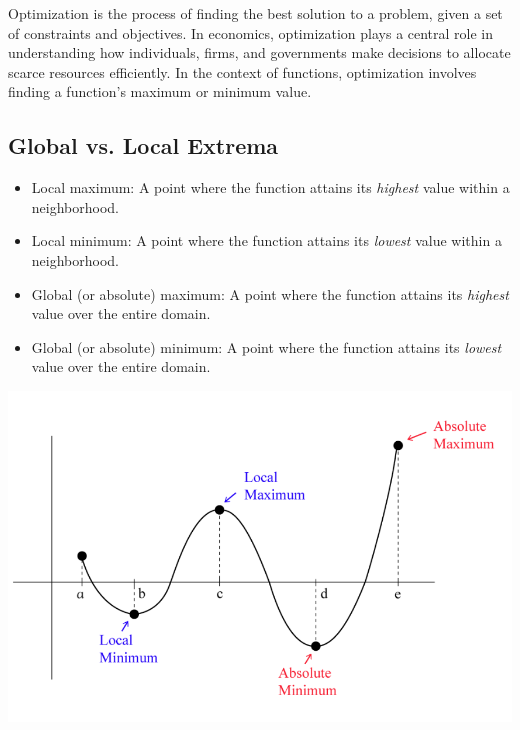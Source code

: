 \documentclass{./../Latex/handout}
\begin{document}
\thispagestyle{plain}
\newcommand{\mytitle}{Optimization}
\myheader{\mytitle}

Optimization is the process of finding the best solution to a problem, given a set of constraints and objectives. In economics, optimization plays a central role in understanding how individuals, firms, and governments make decisions to allocate scarce resources efficiently. In the context of functions, optimization involves finding a function's maximum or minimum value. 

\vspace{-1em}
\subsection*{Global vs. Local Extrema}
\begin{itemize}
  \item Local maximum: A point where the function attains its \textit{highest} value within a neighborhood. 
 \item Local minimum: A point where the function attains its \textit{lowest} value within a neighborhood.
 \item Global (or absolute) maximum: A point where the function attains its \textit{highest} value over the entire domain.
 \item Global (or absolute) minimum: A point where the function attains its \textit{lowest} value over the entire domain.
 \end{itemize}
 
\begin{center}
\includegraphics[scale=0.4]{./Input/global_vs_local.png}	\\
\end{center} 
\end{document}

